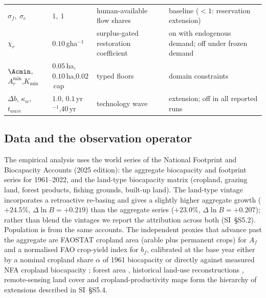 \begin{table}[!htbp]
\begin{tabularx}{\textwidth}{@{}>{\raggedright\arraybackslash}p{} >{\raggedright\arraybackslash}p{} >{\raggedright\arraybackslash}X >{\raggedright\arraybackslash}p{}@{}}
$\sigma_f,\ \sigma_c$ & $1,\ 1$ & human-available flow shares & baseline ($<1$: reservation extension) \\
$\chi_r$ & $0.10$\,gha$^{-1}$ & surplus-gated restoration coefficient & on with endogenous demand; off under frozen demand \\
$\Acmin$, $A_r^{\min}$,\newline $K_{\min}$ & $0.05$\,ha, $0.10$\,ha,\newline $0.02$\,cap & typed floors & domain constraints \\
$\Delta b$, $\kappa_w$,\newline $t_{wave}$ & $1.0$, $0.1$\,yr$^{-1}$,\newline $40$\,yr & technology wave & extension; off in all reported runs \\
\bottomrule
\end{tabularx}
\end{table}

\subsection{Data and the observation operator}\label{sec:data}

The empirical analysis uses the world series of the National Footprint and Biocapacity Accounts (2025 edition): the aggregate biocapacity and footprint series for 1961--2022, and the land-type biocapacity matrix (cropland, grazing land, forest products, fishing grounds, built-up land). The land-type vintage incorporates a retroactive re-basing and gives a slightly higher aggregate growth ($+24.5\%$, $\Delta\ln B=+0.219$) than the aggregate series ($+23.0\%$, $\Delta\ln B=+0.207$); rather than blend the vintages we report the attribution across both (SI~\S S5.2). Population is from the same accounts. The independent proxies that advance past the aggregate are FAOSTAT cropland area (arable plus permanent crops) for $A_f$ and a normalised FAO crop-yield index for $b_f$, calibrated at the base year either by a nominal cropland share $\alpha$ of 1961 biocapacity or directly against measured NFA cropland biocapacity \citep{FAO2023}; forest area \citep{FAO2020}, historical land-use reconstructions \citep{Hurtt2011,KleinGoldewijk2017}, remote-sensing land cover \citep{ESA2017,Copernicus2019} and cropland-productivity maps \citep{Monfreda2008} form the hierarchy of extensions described in SI~\S S5.4.

